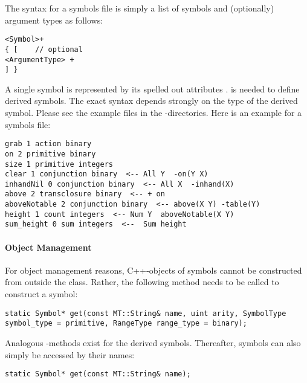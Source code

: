 \documentclass[10pt,twoside,twocolumn,fleqn]{article}
\begin{document}
The syntax for a symbols file is simply a list of symbols and
(optionally) argument types as follows:
\begin{lstlisting}
<Symbol>+
{ [    // optional
<ArgumentType> +
] }
\end{lstlisting}
A single symbol is represented by its spelled out attributes . \code{[otherstuff]} is needed to
define derived symbols. The exact syntax depends strongly on the type of
the derived symbol. Please see the example files in the
-directories. Here is an example for a symbols file:
\begin{lstlisting}
grab 1 action binary
on 2 primitive binary
size 1 primitive integers
clear 1 conjunction binary  <-- All Y  -on(Y X)
inhandNil 0 conjunction binary  <-- All X  -inhand(X)
above 2 transclosure binary  <-- + on
aboveNotable 2 conjunction binary  <-- above(X Y) -table(Y)
height 1 count integers  <-- Num Y  aboveNotable(X Y)
sum_height 0 sum integers  <--  Sum height
\end{lstlisting}




\paragraph{Object Management}

For object management reasons, C++-objects of symbols cannot be constructed
from outside the class. Rather, the following method needs to be called to
construct a symbol:    
\begin{lstlisting}
static Symbol* get(const MT::String& name, uint arity, SymbolType
symbol_type = primitive, RangeType range_type = binary);
\end{lstlisting}
Analogous -methods exist for the derived symbols. Thereafter,
symbols can also simply be accessed by their names:
\begin{lstlisting}
static Symbol* get(const MT::String& name);
\end{lstlisting}





    







\end{document}
